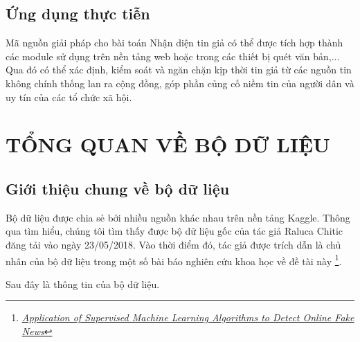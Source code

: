 \documentclass[12pt,a4paper,oneside]{book}
\begin{document}
	\section{Ứng dụng thực tiễn}
	Mã nguồn giải pháp cho bài toán Nhận diện tin giả có thể được tích hợp thành các module sử dụng trên nền tảng web hoặc trong các thiết bị quét văn bản,... Qua đó có thể xác định, kiểm soát và ngăn chặn kịp thời tin giả từ các nguồn tin không chính thống lan ra cộng đồng, góp phần củng cố niềm tin của người dân và uy tín của các tổ chức xã hội.


\chapter{TỔNG QUAN VỀ BỘ DỮ LIỆU}

	

	\section{Giới thiệu chung về bộ dữ liệu}
	
	Bộ dữ liệu được chia sẻ bởi nhiều nguồn khác nhau trên nền tảng Kaggle. Thông qua tìm hiểu, chúng tôi tìm thấy được bộ dữ liệu gốc của tác giả Raluca Chitic đăng tải vào ngày 23/05/2018. Vào thời điểm đó, tác giả được trích dẫn là chủ nhân của bộ dữ liệu trong một số bài báo nghiên cứu khoa học về đề tài này
	\footnote{ \href{https://www.researchgate.net/publication/339299161_Application_of_Supervised_Machine_Learning_Algorithms_to_Detect_Online_Fake_News}{\textit{Application of Supervised Machine Learning Algorithms to Detect Online Fake News}}}.
	
	Sau đây là thông tin của bộ dữ liệu.
	
\end{document}
